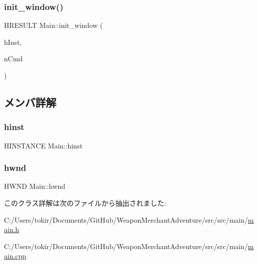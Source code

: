 \subsubsection{\texorpdfstring{init\+\_\+window()}{init\_window()}}
{\footnotesize\ttfamily H\+R\+E\+S\+U\+LT Main\+::init\+\_\+window (\begin{DoxyParamCaption}\item[{H\+I\+N\+S\+T\+A\+N\+CE}]{h\+Inst,  }\item[{int}]{n\+Cmd }\end{DoxyParamCaption})}



\subsection{メンバ詳解}
\mbox{\label{class_main_a7e08e3cceedf7301924454e77d6fe2b1}} 
\subsubsection{\texorpdfstring{hinst}{hinst}}
{\footnotesize\ttfamily H\+I\+N\+S\+T\+A\+N\+CE Main\+::hinst}

\mbox{\label{class_main_a511de4617f7e21d53dfa8bba5e8e40f6}} 
\subsubsection{\texorpdfstring{hwnd}{hwnd}}
{\footnotesize\ttfamily H\+W\+ND Main\+::hwnd}



このクラス詳解は次のファイルから抽出されました\+:\begin{DoxyCompactItemize}
\item 
C\+:/\+Users/tokir/\+Documents/\+Git\+Hub/\+Weapon\+Merchant\+Adventure/src/src/main/\mbox{\hyperlink{main_8h}{main.\+h}}\item 
C\+:/\+Users/tokir/\+Documents/\+Git\+Hub/\+Weapon\+Merchant\+Adventure/src/src/main/\mbox{\hyperlink{main_8cpp}{main.\+cpp}}\end{DoxyCompactItemize}
